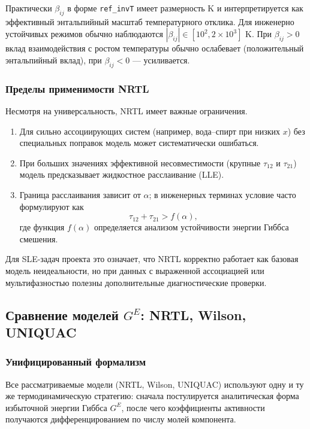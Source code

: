 \documentclass[11pt]{article}
\begin{document}
Практически $\beta_{ij}$ в форме \texttt{ref\_invT} имеет размерность K и интерпретируется как эффективный энтальпийный масштаб температурного отклика. Для инженерно устойчивых режимов обычно наблюдаются $|\beta_{ij}|\in[10^2,2\times10^3]$ K. При $\beta_{ij}>0$ вклад взаимодействия с ростом температуры обычно ослабевает (положительный энтальпийный вклад), при $\beta_{ij}<0$ --- усиливается.

\subsubsection{Пределы применимости NRTL}

Несмотря на универсальность, NRTL имеет важные ограничения.
\begin{enumerate}
  \item Для сильно ассоциирующих систем (например, вода--спирт при низких $x$) без специальных поправок модель может систематически ошибаться.
  \item При больших значениях эффективной несовместимости (крупные $\tau_{12}$ и $\tau_{21}$) модель предсказывает жидкостное расслаивание (LLE).
  \item Граница расслаивания зависит от $\alpha$; в инженерных терминах условие часто формулируют как
  \begin{equation*}
  \tau_{12}+\tau_{21} > f(\alpha),
  \end{equation*}
  где функция $f(\alpha)$ определяется анализом устойчивости энергии Гиббса смешения.
\end{enumerate}

Для SLE-задач проекта это означает, что NRTL корректно работает как базовая модель неидеальности, но при данных с выраженной ассоциацией или мультифазностью полезны дополнительные диагностические проверки.


\subsection{Сравнение моделей $G^E$: NRTL, Wilson, UNIQUAC}

\subsubsection{Унифицированный формализм}

Все рассматриваемые модели (NRTL, Wilson, UNIQUAC) используют одну и ту же термодинамическую стратегию: сначала постулируется аналитическая форма избыточной энергии Гиббса $G^E$, после чего коэффициенты активности получаются дифференцированием по числу молей компонента.
\end{document}
